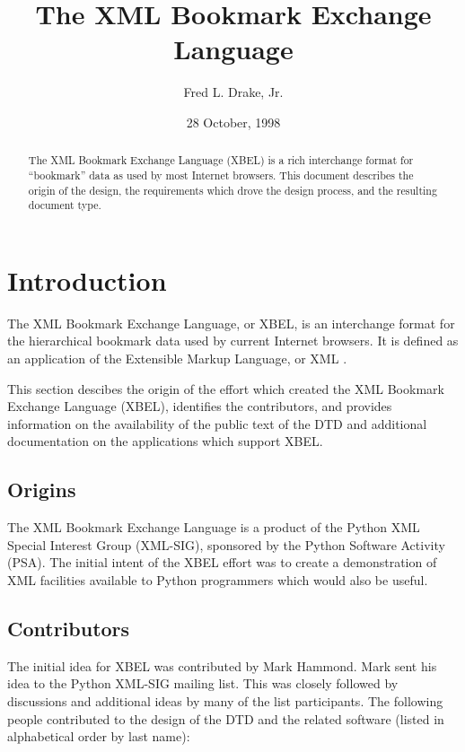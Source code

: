 \documentclass{howto}
\title{The XML Bookmark Exchange Language}
\author{Fred L. Drake, Jr.}
\date{28 October, 1998}			%
\begin{document}
\maketitle

\begin{abstract}
\noindent
The XML Bookmark Exchange Language (XBEL) is a rich interchange
format for ``bookmark'' data as used by most Internet browsers.  This
document describes the origin of the design, the requirements which
drove the design process, and the resulting document type.
\end{abstract}

\tableofcontents


\section{Introduction
         \label{intro}}

  The XML Bookmark Exchange Language, or XBEL, is an interchange
  format for the hierarchical bookmark data used by current Internet
  browsers.  It is defined as an application of the Extensible Markup
  Language, or XML \cite{w3c-xml}.

  This section descibes the origin of the effort which created the XML
  Bookmark Exchange Language (XBEL), identifies the contributors, and
  provides information on the availability of the public text of the
  DTD and additional documentation on the applications which support
  XBEL.

  \subsection{Origins
              \label{origins}}

    The XML Bookmark Exchange Language is a product of the Python XML
    Special Interest Group (XML-SIG), sponsored by the Python Software
    Activity (PSA).  The initial intent of the XBEL effort was to
    create a demonstration of XML facilities available to Python
    programmers which would also be useful.

  \subsection{Contributors
              \label{contrib}}

    The initial idea for XBEL was contributed by Mark Hammond.  Mark
    sent his idea to the Python XML-SIG mailing list.  This was closely
    followed by discussions and additional ideas by many of the list
    participants.  The following people contributed to the design of
    the DTD and the related software (listed in alphabetical order by
    last name):
\end{document}
